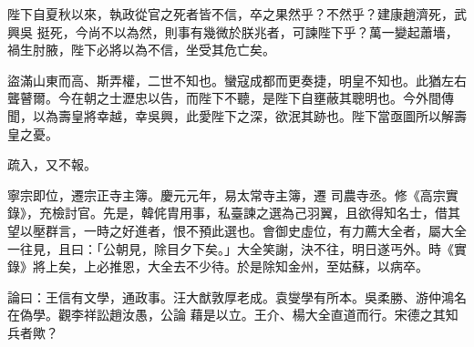 \begin{pinyinscope}
 陛下自夏秋以來，執政從官之死者皆不信，卒之果然乎？不然乎？建康趙濟死，武興吳
 挺死，今尚不以為然，則事有幾微於朕兆者，可諫陛下乎？萬一變起蕭墻，禍生肘腋，陛下必將以為不信，坐受其危亡矣。



 盜滿山東而高、斯弄權，二世不知也。蠻寇成都而更奏捷，明皇不知也。此猶左右聾瞽爾。今在朝之士瀝忠以告，而陛下不聽，是陛下自壅蔽其聰明也。今外間傳聞，以為壽皇將幸越，幸吳興，此愛陛下之深，欲泯其跡也。陛下當亟圖所以解壽皇之憂。



 疏入，又不報。



 寧宗即位，遷宗正寺主簿。慶元元年，易太常寺主簿，遷
 司農寺丞。修《高宗實錄》，充檢討官。先是，韓侂胄用事，私臺諫之選為己羽翼，且欲得知名士，借其望以壓群言，一時之好進者，恨不預此選也。會御史虛位，有力薦大全者，屬大全一往見，且曰：「公朝見，除目夕下矣。」大全笑謝，決不往，明日遂丐外。時《實錄》將上矣，上必推恩，大全去不少待。於是除知金州，至姑蘇，以病卒。



 論曰：王信有文學，通政事。汪大猷敦厚老成。袁燮學有所本。吳柔勝、游仲鴻名在偽學。觀李祥訟趙汝愚，公論
 藉是以立。王介、楊大全直道而行。宋德之其知兵者歟？



\end{pinyinscope}